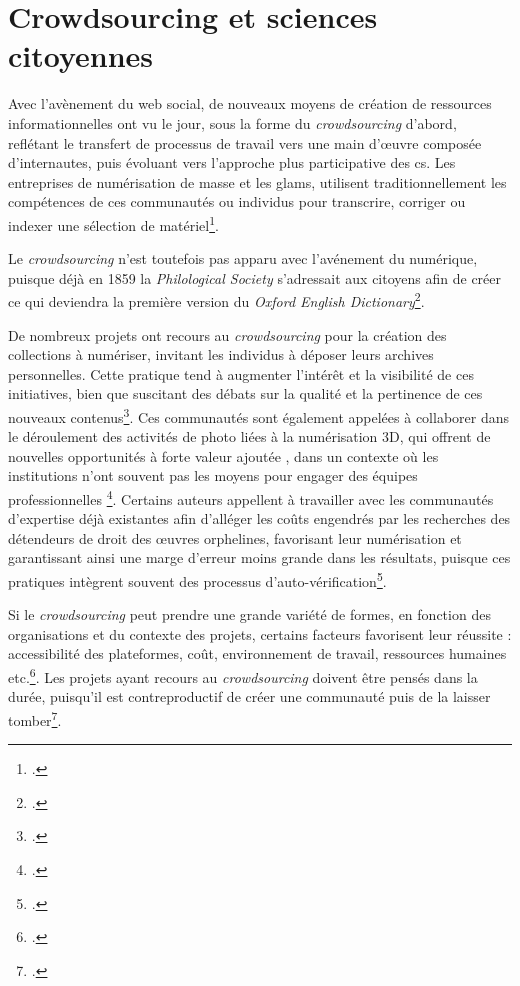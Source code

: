 \section {Crowdsourcing et sciences citoyennes}

Avec l'avènement du web social, de nouveaux moyens de création de ressources informationnelles ont vu le jour, sous la forme du \textit{crowdsourcing} d'abord, reflétant le transfert de processus de travail vers une main d'\oe{}uvre composée d'internautes, puis évoluant vers l'approche plus participative des \gls{cs}. Les entreprises de numérisation de masse et les \gls{glam}s, utilisent traditionnellement les compétences de ces communautés ou individus pour transcrire, corriger ou indexer une sélection de matériel\footcite{coutts_stepping_2017}. 

Le \textit{crowdsourcing} n'est toutefois pas apparu avec l'avénement du numérique, puisque déjà en 1859 la \textit{Philological Society} s'adressait aux citoyens afin de créer ce qui deviendra la première version du \textit{Oxford English Dictionary}\footcite{gupta_enriching_2017}.

De nombreux projets ont recours au \textit{crowdsourcing} pour la création des collections à numériser, invitant les individus à déposer leurs archives personnelles. Cette pratique tend à augmenter l'intérêt et la visibilité de ces initiatives, bien que suscitant des débats sur la qualité et la pertinence de ces nouveaux contenus\footcite{coutts_stepping_2017}. Ces communautés sont également appelées à collaborer dans le déroulement des activités de \gls{photo} liées à la numérisation 3D, qui offrent de nouvelles opportunités à forte valeur ajoutée , dans un contexte où les institutions n'ont souvent pas les moyens pour engager des équipes professionnelles \footcite{chng_crowdsourcing_2019}. Certains auteurs appellent à travailler avec les communautés d'expertise déjà existantes afin d'alléger les coûts engendrés par les recherches des détendeurs de droit des \oe{}uvres orphelines, favorisant leur numérisation et garantissant ainsi une marge d'erreur moins grande dans les résultats, puisque ces pratiques intègrent souvent des processus d'auto-vérification\footcite{stobo_i_2018}.

Si le \textit{crowdsourcing} peut prendre une grande variété de formes, en fonction des organisations et du contexte des projets, certains facteurs favorisent leur réussite : accessibilité des plateformes, coût, environnement de travail, ressources humaines etc.\footcite[p.27]{gupta_enriching_2017}. Les projets ayant recours au \textit{crowdsourcing} doivent être pensés dans la durée, puisqu'il est contreproductif de créer une communauté puis de la laisser tomber\footcite[p.15]{warwick_studying_2012}.


